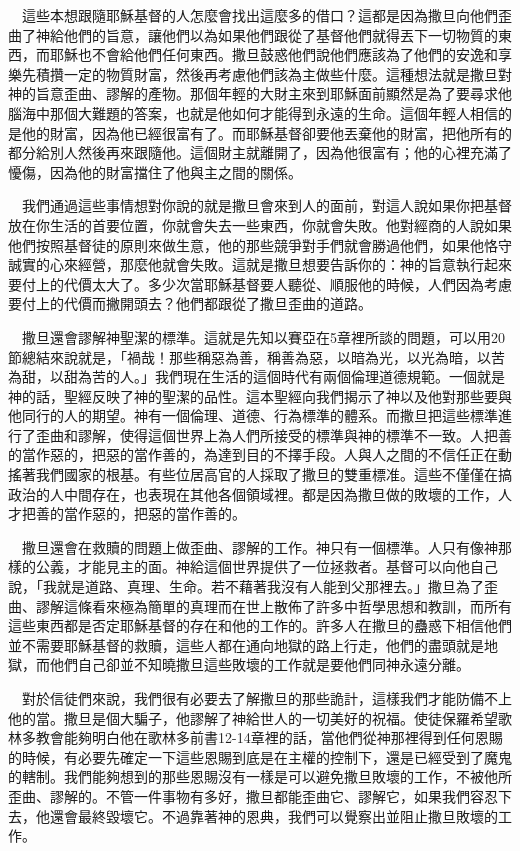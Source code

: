 \documentclass{book}
\begin{document}
　這些本想跟隨耶穌基督的人怎麼會找出這麼多的借口？這都是因為撒旦向他們歪曲了神給他們的旨意，讓他們以為如果他們跟從了基督他們就得丟下一切物質的東西，而耶穌也不會給他們任何東西。撒旦鼓惑他們說他們應該為了他們的安逸和享樂先積攢一定的物質財富，然後再考慮他們該為主做些什麼。這種想法就是撒旦對神的旨意歪曲、謬解的產物。那個年輕的大財主來到耶穌面前顯然是為了要尋求他腦海中那個大難題的答案，也就是他如何才能得到永遠的生命。這個年輕人相信的是他的財富，因為他已經很富有了。而耶穌基督卻要他丟棄他的財富，把他所有的都分給別人然後再來跟隨他。這個財主就離開了，因為他很富有；他的心裡充滿了懮傷，因為他的財富擋住了他與主之間的關係。

　我們通過這些事情想對你說的就是撒旦會來到人的面前，對這人說如果你把基督放在你生活的首要位置，你就會失去一些東西，你就會失敗。他對經商的人說如果他們按照基督徒的原則來做生意，他的那些競爭對手們就會勝過他們，如果他恪守誠實的心來經營，那麼他就會失敗。這就是撒旦想要告訴你的：神的旨意執行起來要付上的代價太大了。多少次當耶穌基督要人聽從、順服他的時候，人們因為考慮要付上的代價而撇開頭去？他們都跟從了撒旦歪曲的道路。

　撒旦還會謬解神聖潔的標準。這就是先知以賽亞在5章裡所談的問題，可以用20節總結來說就是，「禍哉！那些稱惡為善，稱善為惡，以暗為光，以光為暗，以苦為甜，以甜為苦的人。」我們現在生活的這個時代有兩個倫理道德規範。一個就是神的話，聖經反映了神的聖潔的品性。這本聖經向我們揭示了神以及他對那些要與他同行的人的期望。神有一個倫理、道德、行為標準的體系。而撒旦把這些標準進行了歪曲和謬解，使得這個世界上為人們所接受的標準與神的標準不一致。人把善的當作惡的，把惡的當作善的，為達到目的不擇手段。人與人之間的不信任正在動搖著我們國家的根基。有些位居高官的人採取了撒旦的雙重標准。這些不僅僅在搞政治的人中間存在，也表現在其他各個領域裡。都是因為撒旦做的敗壞的工作，人才把善的當作惡的，把惡的當作善的。

　撒旦還會在救贖的問題上做歪曲、謬解的工作。神只有一個標準。人只有像神那樣的公義，才能見主的面。神給這個世界提供了一位拯救者。基督可以向他自己說，「我就是道路、真理、生命。若不藉著我沒有人能到父那裡去。」撒旦為了歪曲、謬解這條看來極為簡單的真理而在世上散佈了許多中哲學思想和教訓，而所有這些東西都是否定耶穌基督的存在和他的工作的。許多人在撒旦的蠱惑下相信他們並不需要耶穌基督的救贖，這些人都在通向地獄的路上行走，他們的盡頭就是地獄，而他們自己卻並不知曉撒旦這些敗壞的工作就是要他們同神永遠分離。

　對於信徒們來說，我們很有必要去了解撒旦的那些詭計，這樣我們才能防備不上他的當。撒旦是個大騙子，他謬解了神給世人的一切美好的祝福。使徒保羅希望歌林多教會能夠明白他在歌林多前書12-14章裡的話，當他們從神那裡得到任何恩賜的時候，有必要先確定一下這些恩賜到底是在主權的控制下，還是已經受到了魔鬼的轄制。我們能夠想到的那些恩賜沒有一樣是可以避免撒旦敗壞的工作，不被他所歪曲、謬解的。不管一件事物有多好，撒旦都能歪曲它、謬解它，如果我們容忍下去，他還會最終毀壞它。不過靠著神的恩典，我們可以覺察出並阻止撒旦敗壞的工作。
\end{document}
